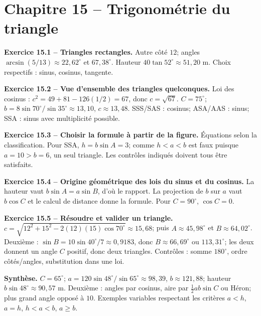 \documentclass[11pt,a4paper,openany]{book}
\begin{document}
\chapter*{Chapitre 15 -- Trigonométrie du triangle}
\begin{answerbox}
\textbf{Exercice 15.1 -- Triangles rectangles.} Autre côté $12$; angles $\arcsin(5/13)\approx22{,}62^\circ$ et $67{,}38^\circ$. Hauteur $40\tan52^\circ\approx51{,}20$ m. Choix respectifs : sinus, cosinus, tangente.\par
\textbf{Exercice 15.2 -- Vue d'ensemble des triangles quelconques.} Loi des cosinus : $c^2=49+81-126(1/2)=67$, donc $c=\sqrt{67}$. $C=75^\circ$; $b=8\sin70^\circ/\sin35^\circ\approx13{,}10$, $c\approx13{,}48$. SSS/SAS : cosinus; ASA/AAS : sinus; SSA : sinus avec multiplicité possible.\par
\textbf{Exercice 15.3 -- Choisir la formule à partir de la figure.} Équations selon la classification. Pour SSA, $h=b\sin A=3$; comme $h<a<b$ est faux puisque $a=10>b=6$, un seul triangle. Les contrôles indiqués doivent tous être satisfaits.\par
\textbf{Exercice 15.4 -- Origine géométrique des lois du sinus et du cosinus.} La hauteur vaut $b\sin A=a\sin B$, d'où le rapport. La projection de $b$ sur $a$ vaut $b\cos C$ et le calcul de distance donne la formule. Pour $C=90^\circ$, $\cos C=0$.\par
\textbf{Exercice 15.5 -- Résoudre et valider un triangle.} $c=\sqrt{12^2+15^2-2(12)(15)\cos70^\circ}\approx15{,}68$; puis $A\approx45{,}98^\circ$ et $B\approx64{,}02^\circ$. Deuxième : $\sin B=10\sin40^\circ/7\approx0{,}9183$, donc $B\approx66{,}69^\circ$ ou $113{,}31^\circ$; les deux donnent un angle $C$ positif, donc deux triangles. Contrôles : somme $180^\circ$, ordre côtés/angles, substitution dans une loi.\par
\medskip\textbf{Synthèse.} $C=65^\circ$; $a=120\sin48^\circ/\sin65^\circ\approx98{,}39$, $b\approx121{,}88$; hauteur $b\sin48^\circ\approx90{,}57$ m. Deuxième : angles par cosinus, aire par $\frac12ab\sin C$ ou Héron; plus grand angle opposé à $10$. Exemples variables respectant les critères $a<h$, $a=h$, $h<a<b$, $a\ge b$.
\end{answerbox}
\end{document}
